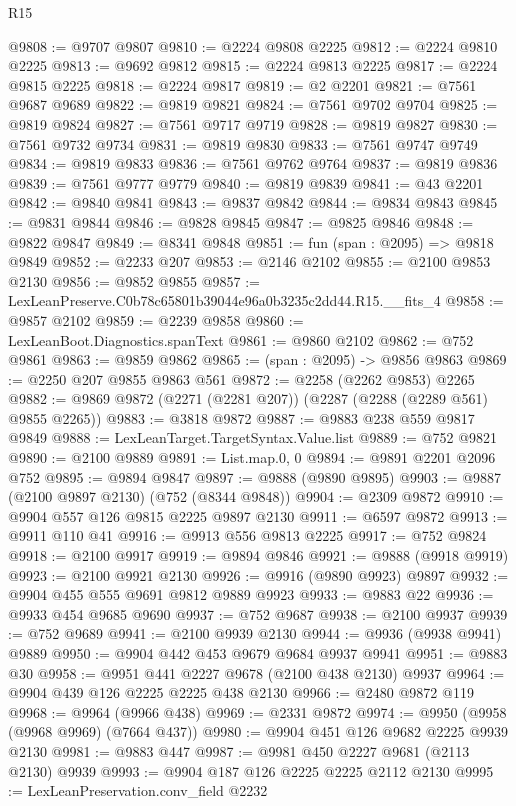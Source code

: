 \begin{lexlean}{R15}
\begin{coremodule}
@9808 := @9707 @9807
@9810 := @2224 @9808 @2225
@9812 := @2224 @9810 @2225
@9813 := @9692 @9812
@9815 := @2224 @9813 @2225
@9817 := @2224 @9815 @2225
@9818 := @2224 @9817
@9819 := @2 @2201
@9821 := @7561 @9687 @9689
@9822 := @9819 @9821
@9824 := @7561 @9702 @9704
@9825 := @9819 @9824
@9827 := @7561 @9717 @9719
@9828 := @9819 @9827
@9830 := @7561 @9732 @9734
@9831 := @9819 @9830
@9833 := @7561 @9747 @9749
@9834 := @9819 @9833
@9836 := @7561 @9762 @9764
@9837 := @9819 @9836
@9839 := @7561 @9777 @9779
@9840 := @9819 @9839
@9841 := @43 @2201
@9842 := @9840 @9841
@9843 := @9837 @9842
@9844 := @9834 @9843
@9845 := @9831 @9844
@9846 := @9828 @9845
@9847 := @9825 @9846
@9848 := @9822 @9847
@9849 := @8341 @9848
@9851 := fun (span : @2095) => @9818 @9849
@9852 := @2233 @207
@9853 := @2146 @2102
@9855 := @2100 @9853 @2130
@9856 := @9852 @9855
@9857 := LexLeanPreserve.C0b78c65801b39044e96a0b3235c2dd44.R15.__fits_4
@9858 := @9857 @2102
@9859 := @2239 @9858
@9860 := LexLeanBoot.Diagnostics.spanText
@9861 := @9860 @2102
@9862 := @752 @9861
@9863 := @9859 @9862
@9865 := (span : @2095) -> @9856 @9863
@9869 := @2250 @207 @9855 @9863 @561
@9872 := @2258 (@2262 @9853) @2265
@9882 := @9869 @9872 (@2271 (@2281 @207)) (@2287 (@2288 (@2289 @561) @9855 @2265))
@9883 := @3818 @9872
@9887 := @9883 @238 @559 @9817 @9849
@9888 := LexLeanTarget.TargetSyntax.Value.list
@9889 := @752 @9821
@9890 := @2100 @9889
@9891 := List.map.{0, 0}
@9894 := @9891 @2201 @2096 @752
@9895 := @9894 @9847
@9897 := @9888 (@9890 @9895)
@9903 := @9887 (@2100 @9897 @2130) (@752 (@8344 @9848))
@9904 := @2309 @9872
@9910 := @9904 @557 @126 @9815 @2225 @9897 @2130
@9911 := @6597 @9872
@9913 := @9911 @110 @41
@9916 := @9913 @556 @9813 @2225
@9917 := @752 @9824
@9918 := @2100 @9917
@9919 := @9894 @9846
@9921 := @9888 (@9918 @9919)
@9923 := @2100 @9921 @2130
@9926 := @9916 (@9890 @9923) @9897
@9932 := @9904 @455 @555 @9691 @9812 @9889 @9923
@9933 := @9883 @22
@9936 := @9933 @454 @9685 @9690
@9937 := @752 @9687
@9938 := @2100 @9937
@9939 := @752 @9689
@9941 := @2100 @9939 @2130
@9944 := @9936 (@9938 @9941) @9889
@9950 := @9904 @442 @453 @9679 @9684 @9937 @9941
@9951 := @9883 @30
@9958 := @9951 @441 @2227 @9678 (@2100 @438 @2130) @9937
@9964 := @9904 @439 @126 @2225 @2225 @438 @2130
@9966 := @2480 @9872 @119
@9968 := @9964 (@9966 @438)
@9969 := @2331 @9872
@9974 := @9950 (@9958 (@9968 @9969) (@7664 @437))
@9980 := @9904 @451 @126 @9682 @2225 @9939 @2130
@9981 := @9883 @447
@9987 := @9981 @450 @2227 @9681 (@2113 @2130) @9939
@9993 := @9904 @187 @126 @2225 @2225 @2112 @2130
@9995 := LexLeanPreservation.conv_field @2232

\end{coremodule}
\end{lexlean}

